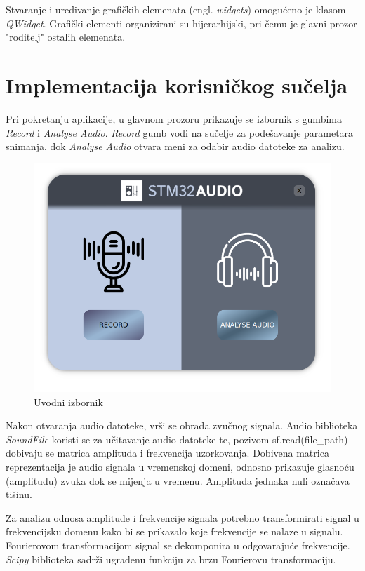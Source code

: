 Stvaranje i uređivanje grafičkih elemenata (engl. \textit{widgets}) omogućeno je klasom \textit{QWidget}. Grafički elementi organizirani su hijerarhijski, pri čemu je glavni prozor "roditelj" ostalih elemenata. 

\section{Implementacija korisničkog sučelja}

Pri pokretanju aplikacije, u glavnom prozoru prikazuje se izbornik s gumbima \textit{Record} i \textit{Analyse Audio}. \textit{Record} gumb vodi na sučelje za podešavanje parametara snimanja, dok \textit{Analyse Audio} otvara meni za odabir audio datoteke za analizu.

\begin{figure}[ht]
	\includegraphics[width=\linewidth]{imgs/intro_form}
	\caption{Uvodni izbornik}
	\label{fig:intro_form}
\end{figure}

Nakon otvaranja audio datoteke, vrši se obrada zvučnog signala. Audio biblioteka \textit{SoundFile} koristi se za učitavanje audio datoteke te, pozivom 
sf.read(file\_path)
dobivaju se matrica amplituda i frekvencija uzorkovanja. Dobivena matrica reprezentacija je audio signala u vremenskoj domeni, odnosno prikazuje glasnoću (amplitudu) zvuka dok se mijenja u vremenu. Amplituda jednaka nuli označava tišinu.

Za analizu odnosa amplitude i frekvencije signala potrebno transformirati signal u frekvencijsku domenu kako bi se prikazalo koje frekvencije se nalaze u signalu. Fourierovom transformacijom signal se dekomponira u odgovarajuće frekvencije. \textit{Scipy} biblioteka sadrži ugrađenu funkciju za brzu Fourierovu transformaciju.

